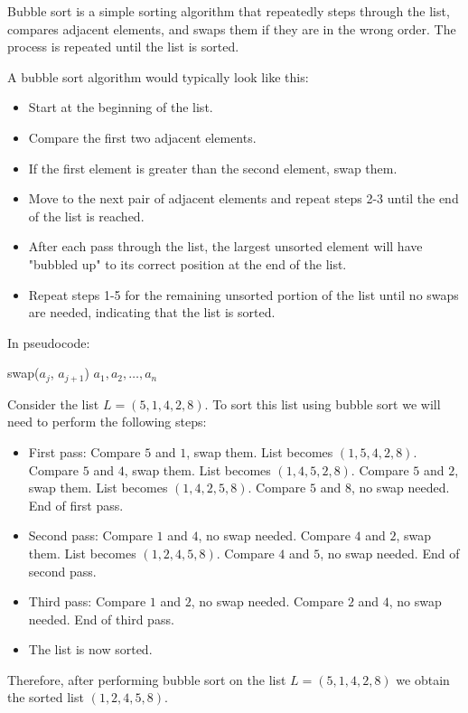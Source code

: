 \begin{definition}
    Bubble sort is a simple sorting algorithm that repeatedly steps through the list, compares adjacent elements, and swaps them if they are in the wrong order. The process is repeated until the list is sorted.
\end{definition}
\begin{eg}
    A bubble sort algorithm would typically look like this:
    \begin{itemize}[itemsep=1pt,label=$\circ$]
        \item Start at the beginning of the list.
        \item Compare the first two adjacent elements.
        \item If the first element is greater than the second element, swap them.
        \item Move to the next pair of adjacent elements and repeat steps 2-3 until the end of the list is reached.
        \item After each pass through the list, the largest unsorted element will have "bubbled up" to its correct position at the end of the list.
        \item Repeat steps 1-5 for the remaining unsorted portion of the list until no swaps are needed, indicating that the list is sorted.
    \end{itemize}
    In pseudocode:
    \begin{algorithmic}
                        \State swap($a_j$, $a_{j+1}$)
                    \EndIf
                \EndFor
            \EndFor
            \State \Return $a_1, a_2, \ldots, a_n$
        \EndFunction
    \end{algorithmic}
\end{eg}
\begin{eg}
    Consider the list $L = (5, 1, 4, 2, 8)$. To sort this list using bubble sort we will need to perform the following steps:
    \begin{itemize}[itemsep=1pt,label=$\circ$]
        \item First pass: Compare $5$ and $1$, swap them. List becomes $(1, 5, 4, 2, 8)$. Compare $5$ and $4$, swap them. List becomes $(1, 4, 5, 2, 8)$. Compare $5$ and $2$, swap them. List becomes $(1, 4, 2, 5, 8)$. Compare $5$ and $8$, no swap needed. End of first pass.
        \item Second pass: Compare $1$ and $4$, no swap needed. Compare $4$ and $2$, swap them. List becomes $(1, 2, 4, 5, 8)$. Compare $4$ and $5$, no swap needed. End of second pass.
        \item Third pass: Compare $1$ and $2$, no swap needed. Compare $2$ and $4$, no swap needed. End of third pass.
        \item The list is now sorted.
    \end{itemize}
    Therefore, after performing bubble sort on the list $L = (5, 1, 4, 2, 8)$ we obtain the sorted list $(1, 2, 4, 5, 8)$.
\end{eg}
